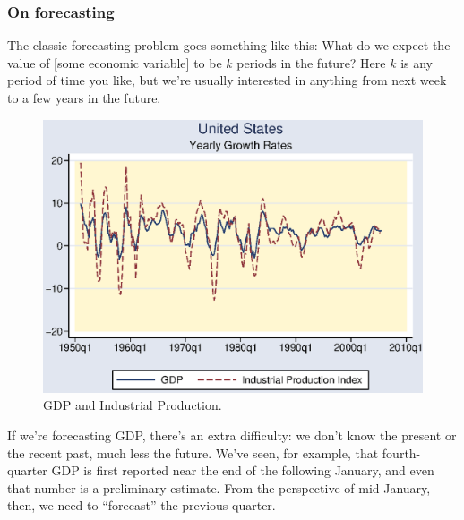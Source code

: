 \documentclass[letterpaper,12pt]{article}
\begin{document}
\subsubsection*{On forecasting}

The classic forecasting problem goes something like this:
What do we expect the value of [some
economic variable] to be $k$ periods in the future?
Here $k$ is any period of time you like, but
we're usually interested in anything from next week to a few years in
the future.

\begin{figure}
    \centering
    \includegraphics[scale=0.8]{us_gdp_indprod.eps}
    \caption{GDP and Industrial Production.}
    \label{fig:ip_gdp}%
\end{figure}


If we're forecasting GDP, there's an extra difficulty: we don't
know the present or the recent past, much less the future. We've
seen, for example, that fourth-quarter GDP is first reported near
the end of the following January, and even that number is a
preliminary estimate. From the perspective of mid-January, then,
we need to ``forecast'' the previous quarter.
\end{document}
